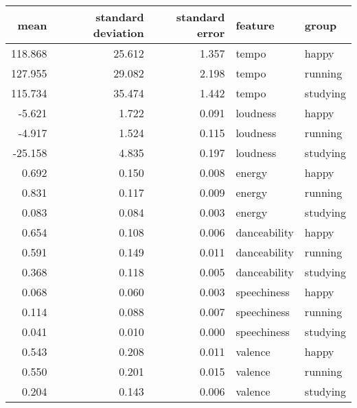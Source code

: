 \begin{tabular}{rrrll}
\toprule
   mean &  standard deviation &  standard error &      feature &    group \\
\midrule
118.868 &              25.612 &           1.357 &        tempo &    happy \\
127.955 &              29.082 &           2.198 &        tempo &  running \\
115.734 &              35.474 &           1.442 &        tempo & studying \\
 -5.621 &               1.722 &           0.091 &     loudness &    happy \\
 -4.917 &               1.524 &           0.115 &     loudness &  running \\
-25.158 &               4.835 &           0.197 &     loudness & studying \\
  0.692 &               0.150 &           0.008 &       energy &    happy \\
  0.831 &               0.117 &           0.009 &       energy &  running \\
  0.083 &               0.084 &           0.003 &       energy & studying \\
  0.654 &               0.108 &           0.006 & danceability &    happy \\
  0.591 &               0.149 &           0.011 & danceability &  running \\
  0.368 &               0.118 &           0.005 & danceability & studying \\
  0.068 &               0.060 &           0.003 &  speechiness &    happy \\
  0.114 &               0.088 &           0.007 &  speechiness &  running \\
  0.041 &               0.010 &           0.000 &  speechiness & studying \\
  0.543 &               0.208 &           0.011 &      valence &    happy \\
  0.550 &               0.201 &           0.015 &      valence &  running \\
  0.204 &               0.143 &           0.006 &      valence & studying \\
\bottomrule
\end{tabular}
